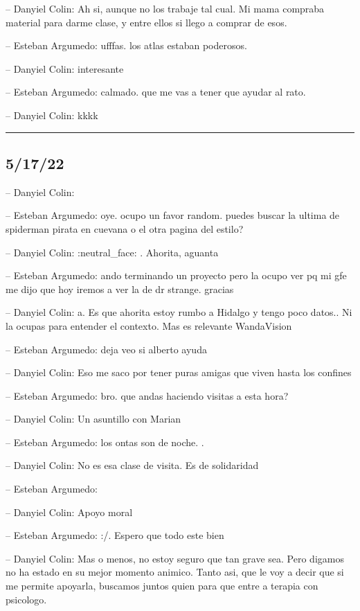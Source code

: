 -- Danyiel Colin: Ah si, aunque no los trabaje tal cual. Mi mama
compraba material para darme clase, y entre ellos si llego a comprar de
esos.

-- Esteban Argumedo: ufffas. los atlas estaban poderosos.

-- Danyiel Colin: interesante

-- Esteban Argumedo: calmado. que me vas a tener que ayudar al rato.

-- Danyiel Colin: kkkk

\begin{center}\rule{0.5\linewidth}{0.5pt}\end{center}

\hypertarget{section-79}{%
\subsection{5/17/22}\label{section-79}}

-- Danyiel Colin:

-- Esteban Argumedo: oye. ocupo un favor random. puedes buscar la ultima
de spiderman pirata en cuevana o el otra pagina del estilo?

-- Danyiel Colin: :neutral\_face: . Ahorita, aguanta

-- Esteban Argumedo: ando terminando un proyecto pero la ocupo ver pq mi
gfe me dijo que hoy iremos a ver la de dr strange. gracias

-- Danyiel Colin: a. Es que ahorita estoy rumbo a Hidalgo y tengo poco
datos.. Ni la ocupas para entender el contexto. Mas es relevante
WandaVision

-- Esteban Argumedo: deja veo si alberto ayuda

-- Danyiel Colin: Eso me saco por tener puras amigas que viven hasta los
confines

-- Esteban Argumedo: bro. que andas haciendo visitas a esta hora?

-- Danyiel Colin: Un asuntillo con Marian

-- Esteban Argumedo: los ontas son de noche. .

-- Danyiel Colin: No es esa clase de visita. Es de solidaridad

-- Esteban Argumedo:

-- Danyiel Colin: Apoyo moral

-- Esteban Argumedo: :/. Espero que todo este bien

-- Danyiel Colin: Mas o menos, no estoy seguro que tan grave sea. Pero
digamos no ha estado en su mejor momento animico. Tanto asi, que le voy
a decir que si me permite apoyarla, buscamos juntos quien para que entre
a terapia con psicologo.

